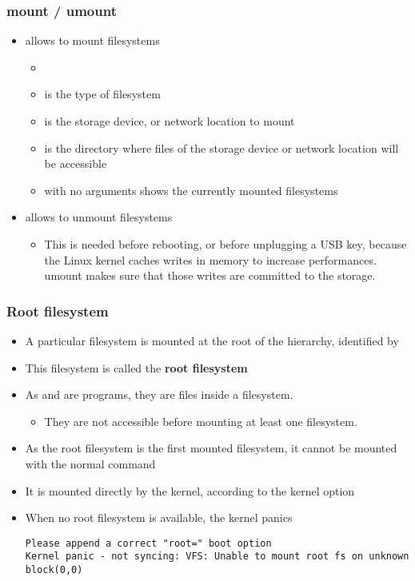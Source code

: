 \begin{frame}
  \frametitle{mount / umount}
  \begin{itemize}
  \item {} allows to mount filesystems
    \begin{itemize}
    \item {}
    \item {} is the type of filesystem
    \item {} is the storage device, or network location to
      mount
    \item {} is the directory where files of the
      storage device or network location will be accessible
    \item {} with no arguments shows the currently mounted
      filesystems
    \end{itemize}
  \item {} allows to unmount filesystems
    \begin{itemize}
    \item This is needed before rebooting, or before unplugging a USB
      key, because the Linux kernel caches writes in memory to
      increase performances. umount makes sure that those writes are
      committed to the storage.
    \end{itemize}
  \end{itemize}
\end{frame}

\begin{frame}[fragile]
  \frametitle{Root filesystem}
  \begin{itemize}
  \item A particular filesystem is mounted at the root of the hierarchy,
    identified by \code{/}
  \item This filesystem is called the {\bf root filesystem}
  \item As  and  are programs, they are files
    inside a filesystem.
    \begin{itemize}
    \item They are not accessible before mounting at least one filesystem.
    \end{itemize}
  \item As the root filesystem is the first mounted filesystem, it
    cannot be mounted with the normal  command
  \item It is mounted directly by the kernel, according to the
     kernel option
  \item When no root filesystem is available, the kernel panics\\
    \tiny
\begin{verbatim}
Please append a correct "root=" boot option
Kernel panic - not syncing: VFS: Unable to mount root fs on unknown block(0,0)
\end{verbatim}
  \end{itemize}
\end{frame}

